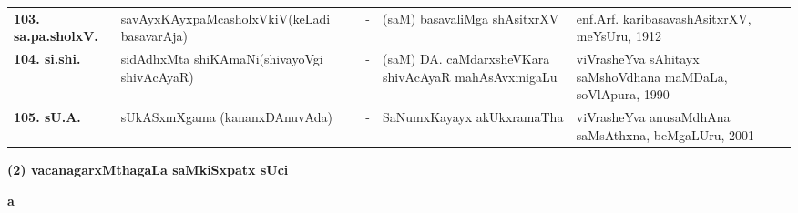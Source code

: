 {\begin{longtable}{@{}lp{5cm}cp{5cm}<{\raggedright}p{3cm}<{\raggedright}@{}}
{\bf 103. sa.pa.sholxV.} & savAyxKAyxpaMcasholxVkiV\newline (keLadi basavarAja) &-& (saM) basavaliMga shAsitxrXV & enf.Arf. karibasavashAsitxrXV, meYsUru, 1912\\
{\bf 104. si.shi.} & sidAdhxMta shiKAmaNi\newline (shivayoVgi shivAcAyaR) &-& (saM) DA. caMdarxsheVKara shivAcAyaR mahAsAvxmigaLu & viVrasheYva sAhitayx saMshoVdhana maMDaLa, soVlApura, 1990\\
{\bf 105. sU.A.} & sUkASxmXgama (kananxDAnuvAda) &-& SaNumxKayayx akUkxramaTha & viVrasheYva anusaMdhAna saMsAthxna, beMgaLUru, 2001\\
\end{longtable}}


\newpage

\begin{center}
{\large\bf (2) vacanagarxMthagaLa saMkiSxpatx sUci}
\end{center}

\medskip

\centerline{\bf a}

\medskip

